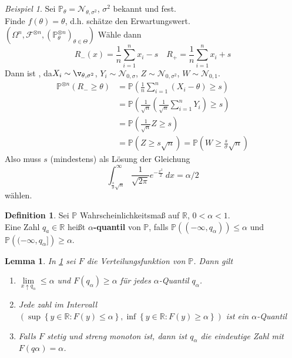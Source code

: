 \documentclass[10pt,a4paper]{article}
\newcommand{\R}{\ensuremath{\mathbb{R}}}
\newcommand{\al}{\ensuremath{\alpha}}
\newcommand{\Prb}{\mathbb P}
\newcommand{\scF}{\ensuremath{\mathscr{F}}}
\newcommand{\Nv}{\mathscr N}
\theoremstyle{plain}
\newtheorem{lem}[theorem]{Lemma}
\theoremstyle{definition}
\newtheorem{definition}[theorem]{Definition}
\theoremstyle{remark}
\newtheorem{exm}[theorem]{Beispiel}
\begin{document}
	\begin{exm}\label{0622exm}
		Sei $\Prb_\theta=\Nv_{\theta,\sigma^2}$, $\sigma^2$ bekannt und fest.\\
		Finde $f(\theta)=\theta$, d.h. schätze den Erwartungswert.\\
		$(\Omega^n,\scF^{\otimes n},(\Prb^{\otimes n}_\theta)_{\theta\in\Theta})$
		Wähle dann
		\[R_-(x)=\frac{1}{n}\sum_{i=1}^{n}x_i-s\quad R_+=\frac{1}{n}\sum_{i=1}^{n}x_i+s\]
		Dann ist , da$X_i\sim\v_{\theta,\sigma^2}$, $Y_i\sim\Nv_{0,\sigma}$, $Z\sim\Nv_{0,\sigma^2}$, $W\sim\Nv_{0,1}$.
		\begin{align*}
		\Prb^{\otimes n}(R_-\geq \theta)&=\Prb\left(\frac{1}{n}\sum_{i=1}^{n}(X_i-\theta)\geq s\right)\\
		&=\Prb\left(\frac{1}{\sqrt n}\left(\frac{1}{\sqrt{n}}\sum_{i=1}^{n}Y_i\right)\geq s\right)\\
		&=\Prb\left(\frac{1}{\sqrt{n}}Z\geq s\right)\\
		&=\Prb(Z\geq s\sqrt{n})=\Prb\left(W\geq \frac{s}{\sigma}\sqrt{ n}\right)
		\end{align*}
		Also muss $s$ (mindestens) als Lösung der Gleichung
		\[\int_{\frac{s}{\sigma}\sqrt{n}}^\infty\frac{1}{\sqrt{2\pi}}e^{-\frac{x^2}{2}}~dx=\al/2\]
		wählen.
	\end{exm}
	\begin{definition}\label{0623def}
		Sei $\Prb$ Wahrscheinlichkeitsmaß auf $\R$, $0<\al<1$.\\
		Eine Zahl $q_a\in\R$ heißt \textbf{$\al$-quantil} von $\Prb$, falls $\Prb\left((-\infty,q_\al)\right)\leq \al$ und $\Prb\left((-\infty,q_\al]\right)\geq\al$.
	\end{definition}

	\begin{lem}\label{0624lem}
		In \ref{0623def} sei $F$ die Verteilungsfunktion von $\Prb$. Dann gilt
		\begin{enumerate}
			\item $\lim\limits_{x\uparrow q_\al}\leq \al$ und $F(q_\al)\geq\al$ für jedes $\al$-Quantil $q_\al$.
			\item Jede zahl im Intervall $\left(\sup\left\{y\in\R:F(y)\leq \al\right\},\inf\left\{y\in\R:F(y)\geq\al\right\}\right)$ ist ein $\al$-Quantil
			\item Falls $F$ stetig und streng monoton ist, dann ist $q_\al$ die eindeutige Zahl mit $F(q\al)=\al$.
		\end{enumerate}
	\end{lem}
	
\end{document}

